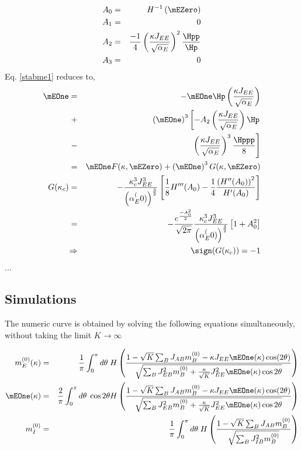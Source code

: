 \begin{eqnarray}
A_0 =&& H^{-1} \left( \mEZero \right) \\
A_1 =&& 0 \\
A_2 =&& \frac{-1}{4} \avar^2 \frac{\Hpp}{\Hp}\\
A_3 =&& 0
\end{eqnarray}
 Eq. \ref{stabme1} reduces to, 
\begin{eqnarray}
\mEOne =&& - \mEOne \Hp \avar  \\
+&&  \left( \mEOne \right)^3 \left[- A_2 \avar \Hp \right. \nonumber \\
-&& \left.  \avar^3  \frac{\Hppp}{8}  \right] \\ 
=&& \mEOne F(\kappa, \mEZero) + \left( \mEOne \right)^3 G(\kappa, \mEZero) \\
G(\kappa_c)  =&& -\frac{\kappa^3_c J_{EE}^{3}}{\left( \alpha_E^(0) \right)^{\frac{3}{2}}} \left[ \frac{1}{8} H^{\prime \prime \prime} (A_0) - \frac{1}{4} \frac{\left( H^{\prime \prime} (A_0)\right)^2 }{H^{\prime}(A_0)} \right] \\
=&& - \frac{e^{\frac{-A^2_0}{2}}}{\sqrt{2 \pi}} \frac{\kappa^3_c J_{EE}^{3}}{\left( \alpha_E^(0) \right)^{\frac{3}{2}}}  \left[1 + A^2_0 \right] \\
\Rightarrow&& \sign(G(\kappa_c)) = -1
\end{eqnarray} 
...\\
\subsection{Simulations}
The numeric curve is obtained by solving the following equations simultaneously, without taking the limit $K \rightarrow \infty$ 
\begin{widetext}
\begin{eqnarray}
\label{me0Sol}
m_E^{(0)}(\kappa) =&& \frac{1}{\pi} \int_0^\pi d\theta \;  H\left( \frac{1 - \sqrt{K} \sum_B J_{AB} m_B^{(0)} - \kappa J_{EE} \mEOne(\kappa) \cos(2 \theta) }{\sqrt{\sum_B J_{EB}^2 m_B^{(0)} + \frac{\kappa}{\sqrt{K}} J^2_{EE} \mEOne(\kappa) \cos2\theta} } \right)\\
\label{me1Sol}
\mEOne(\kappa) =&& \frac{2}{\pi} \int_0^\pi d\theta \; \cos 2\theta H\left( \frac{1 - \sqrt{K} \sum_B J_{AB} m_B^{(0)} - \kappa J_{EE} \mEOne(\kappa)  \cos(2 \theta)}{\sqrt{\sum_B J_{EB}^2 m_B^{(0)} + \frac{\kappa}{\sqrt{K}} J^2_{EE} \mEOne(\kappa) \cos2\theta} } \right)  \\
\label{mi0Sol}
m_I^{(0)} =&& \frac{1}{\pi} \int_0^\pi d\theta \;  H\left( \frac{1 - \sqrt{K} \sum_B J_{AB} m_B^{(0)} }{\sqrt{\sum_B J_{IB}^2 m_B^{(0)}}} \right) \\
\end{eqnarray}
\end{widetext}

